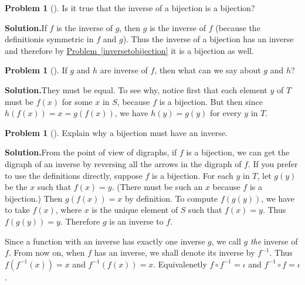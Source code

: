 \documentclass[10pt,]{book}
\theoremstyle{plain}
\theoremstyle{definition}
\newtheorem{activity}[project]{Problem}
\theoremstyle{definition}
\numberwithin{equation}{chapter}
\begin{document}
\begin{activity}[]\label{activity-341}
Is it true that the inverse of a bijection is a bijection?%
\par\medskip\noindent%
\textbf{Solution.}\quad If \(f\) is the inverse of \(g\), then \(g\) is the inverse of \(f\) (because the definitionis symmetric in \(f\) and \(g\)).  Thus the inverse of a bijection has an inverse and therefore by \hyperref[inversetobijection]{Problem~\ref{inversetobijection}} it is a bijection as well.%
\end{activity}
\begin{activity}[]\label{activity-342}
If \(g\) and \(h\) are inverse of \(f\), then what can we say about \(g\) and \(h\)?%
\par\medskip\noindent%
\textbf{Solution.}\quad They must be equal.  To see why, notice first that each element \(y\) of \(T\) must be \(f(x)\) for some \(x\) in \(S\), because \(f\) is a bijection.  But then since \(h(f(x)) = x = g(f(x))\), we have \(h(y) = g(y)\) for every \(y\) in \(T\).%
\end{activity}
\begin{activity}[]\label{activity-343}
Explain why a bijection must have an inverse.%
\par\medskip\noindent%
\textbf{Solution.}\quad From the point of view of digraphs, if \(f\) is a bijection, we can get the digraph of an inverse by reversing all the arrows in the digraph of \(f\). If you prefer to use the definitions directly, suppose \(f\) is a bijection. For each \(y\) in \(T\), let \(g(y)\) be the \(x\) such that \(f(x) = y\). (There must be such an \(x\) because \(f\) is a bijection.) Then \(g(f(x)) = x\) by definition. To compute \(f(g(y))\), we have to take \(f(x)\), where \(x\) is the unique element of \(S\) such that \(f(x) = y\). Thus \(f(g(y)) = y\). Therefore \(g\) is an inverse to \(f\).%
\end{activity}
Since a function with an inverse has exactly one inverse \(g\), we call \(g\) \emph{the} inverse of \(f\).  From now on, when \(f\) has an inverse, we shall denote its inverse by \(f^{-1}\).  Thus \(f(f^{-1}(x)) = x\) and \(f^{-1}(f(x)) = x\).  Equivalenetly \(f\circ f^{-1} = \iota\) and \(f^{-1} \circ f = \iota\).%
\typeout{************************************************}
\typeout{************************************************}
\end{document}

